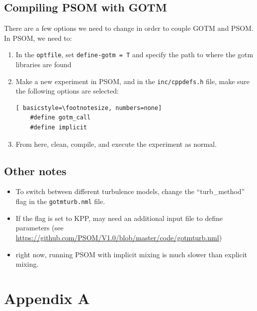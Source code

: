 \documentclass[12pt,letterpaper,titlepage]{article}
\begin{document}
\subsection{Compiling PSOM with GOTM}
There are a few options we need to change in order to couple GOTM and PSOM. In PSOM, we need to:
\begin{enumerate}
    \item In the \texttt{optfile}, set \texttt{define-gotm = T} and specify the path to where the gotm libraries are found
    \item Make a new experiment in PSOM, and in the \texttt{inc/cppdefs.h} file, make sure the following options are selected:
    \begin{lstlisting}[	basicstyle=\footnotesize, numbers=none]
    #define gotm_call
    #define implicit
    \end{lstlisting}
    \item From here, clean, compile, and execute the experiment as normal. 
\end{enumerate}

\subsection{Other notes}
\begin{itemize}
    \item To switch between different turbulence models, change the ``turb\_method'' flag in the \texttt{gotmturb.nml} file.
    \item If the flag is set to KPP, may need an additional input file to define parameters (see \href{https://github.com/PSOM/V1.0/blob/master/code/gotmturb.nml}{ https://github.com/PSOM/V1.0/blob/master/code/gotmturb.nml})
    \item right now, running PSOM with implicit mixing is much slower than explicit mixing. 
\end{itemize}

\pagebreak
\appendix
%

\section{Appendix A}
\label{app: particle_sinking}

\end{document}
